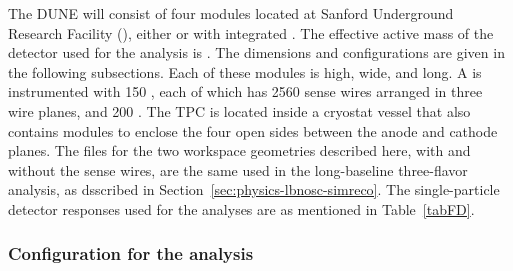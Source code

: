 The DUNE  will consist of four \nominalmodsize \lartpc modules located at Sanford Underground Research Facility (\surf), %
either  or  with integrated .  
The effective active mass of the detector used for the analysis is \fdfiducialmass. The  dimensions and   configurations are given in the following subsections.
Each of these modules is \tpcheight high, \cryostatwdth wide, and \cryostatlen long. A \single {} is instrumented with 150 , each of which has 2560 sense wires
arranged in three wire planes, and 200 . The TPC is located inside a cryostat vessel that also contains  modules to enclose the four open sides between the anode and cathode planes. %
The  files for the two   workspace geometries described here, with and without the 
sense wires, are the same used in the long-baseline three-flavor analysis, as dsscribed in Section~\ref{sec:physics-lbnosc-simreco}.
The single-particle detector responses used for the analyses are as mentioned in Table~\ref{tabFD}.
\begin{table}[h]
    \begin{center}
        \end{center}
        \caption{\label{tabFD}FD properties used for the analyses. }
    \end{table} 
    
 \subsubsection{  Configuration for the  analysis}
 

